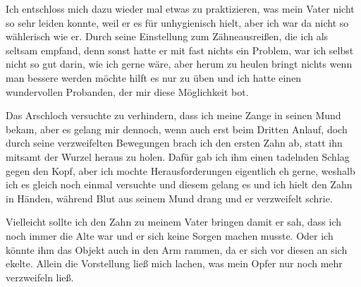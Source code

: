\documentclass[11pt, a5paper]{article}
\begin{document}
\begin{spacing}{1.2}
		Ich entschloss mich dazu wieder mal etwas zu praktizieren, was mein Vater nicht so sehr leiden konnte, weil er es für unhygienisch hielt, aber ich war da nicht so wählerisch wie er. Durch seine Einstellung zum Zähneausreißen, die ich als seltsam empfand, denn sonst hatte er mit fast nichts ein Problem, war ich selbst nicht so gut darin, wie ich gerne wäre, aber herum zu heulen bringt nichts wenn man bessere werden möchte hilft es nur zu üben und ich hatte einen wundervollen Probanden, der mir diese Möglichkeit bot.
		
		Das Arschloch versuchte zu verhindern, dass ich meine Zange in seinen Mund bekam, aber es gelang mir dennoch, wenn auch erst beim Dritten Anlauf, doch durch seine verzweifelten Bewegungen brach ich den ersten Zahn ab, statt ihn mitsamt der Wurzel heraus zu holen. Dafür gab ich ihm einen tadelnden Schlag gegen den Kopf, aber ich mochte Herausforderungen eigentlich eh gerne, weshalb ich es gleich noch einmal versuchte und diesem gelang es und ich hielt den Zahn in Händen, während Blut aus seinem Mund drang und er verzweifelt schrie.
		
		Vielleicht sollte ich den Zahn zu meinem Vater bringen damit er sah, dass ich noch immer die Alte war und er sich keine Sorgen machen musste. Oder ich könnte ihm das Objekt auch in den Arm rammen, da er sich vor diesen an sich ekelte. Allein die Vorstellung ließ mich lachen, was mein Opfer nur noch mehr verzweifeln ließ.
	\end{spacing}
\end{document}
